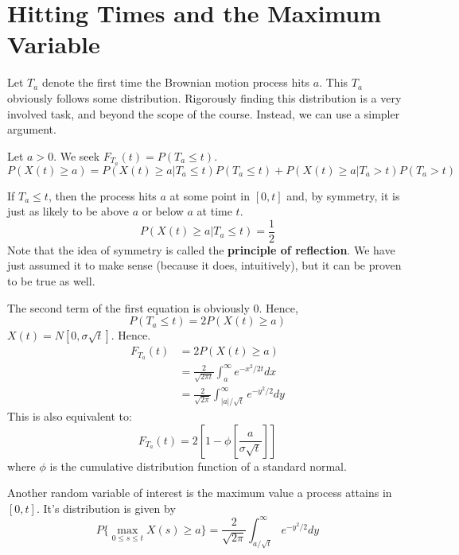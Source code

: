 \documentclass[12pt,letterpaper]{book}
\theoremstyle{definition}
\begin{document}
\section{Hitting Times and the Maximum Variable}

Let $T_a$ denote the first time the Brownian motion process hits $a$. This $T_a$ obviously follows some distribution. Rigorously finding this distribution is a very involved task, and beyond the scope of the course. Instead, we can use a simpler argument.

Let $a > 0$. We seek $F_{T_a}(t) = P(T_a \leq t)$.
\[P(X(t) \geq a) = P(X(t) \geq a | T_a \leq t) P(T_a \leq t) + P(X(t) \geq a | T_a > t)P(T_a > t) \]

If $T_a \leq t$, then the process hits $a$ at some point in $[0,t]$ and, by symmetry, it is just as likely to be above $a$ or below $a$ at time $t$.
\[P(X(t) \geq a | T_a \leq t) = \frac{1}{2}\]
Note that the idea of symmetry is called the \textbf{principle of reflection}. We have just assumed it to make sense (because it does, intuitively), but it can be proven to be true as well. 

The second term of the first equation is obviously 0. Hence,
\[P(T_a \leq t) = 2 P(X(t) \geq a)\]
$X(t) = N[0, \sigma \sqrt t ]$. Hence.
\begin{align*}
  F_{T_a}(t) &= 2 P(X(t) \geq a)  \\
             &= \frac{2}{\sqrt{2 \pi t}} \int_{a}^{\infty} e^{-x^2/2t}dx \\
             &= \frac{2}{\sqrt{2 \pi}} \int_{|a|/\sqrt{t}}^{\infty} e^{-y^2/2}dy 
\end{align*}
This is also equivalent to:
\[F_{T_a}(t) = 2 \left[ 1 - \phi \left[ \frac{a}{\sigma \sqrt{t}}\right]\right]\]
where $\phi$ is the cumulative distribution function of a standard normal.

Another random variable of interest is the maximum value a process attains in $[0,t]$. It's distribution is given by
\[P \{\max_{0 \leq s \leq t} X(s) \geq a\} = \frac{2}{\sqrt{2 \pi}} \int_{a/\sqrt{t}}^{\infty} e^{-y^2/2} dy\]
\end{document}
